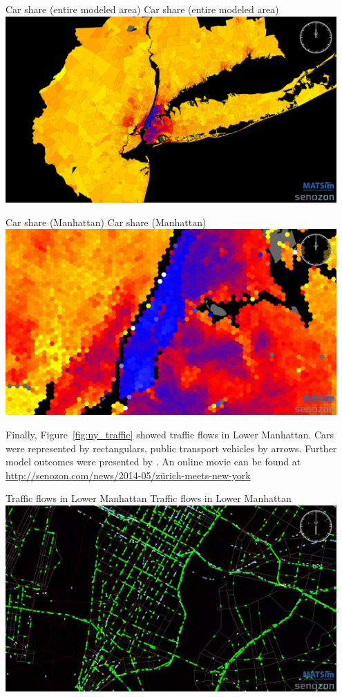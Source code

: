 \createfigure%
{Car share (entire modeled area)}%
{Car share (entire modeled area)}%
{\label{fig:ny_car_share_full}}%
{\includegraphics[width=0.95\textwidth, angle=0]{./scenarios/figures/ny_carshare_TAZ_full.png}}%
{}

\createfigure%
{Car share (Manhattan)}%
{Car share (Manhattan)}%
{\label{fig:ny_car_share_gross}}%
{\includegraphics[width=0.95\textwidth, angle=0]{./scenarios/figures/ny_carshare_gross.png}}%
{}

Finally, Figure~\ref{fig:ny_traffic} showed traffic flows in Lower Manhattan. Cars were represented by rectangulars, public transport vehicles by arrows. Further model outcomes were presented by \citet[][]{Balmer_unpub_ZMNY_2014}. An online movie can be found at \url{http://senozon.com/news/2014-05/zürich-meets-new-york}

\createfigure%
{Traffic flows in Lower Manhattan}%
{Traffic flows in Lower Manhattan}%
{\label{fig:ny_traffic}}%
{\includegraphics[width=0.95\textwidth, angle=0]{./scenarios/figures/ny_traffic.png}}%
{}

